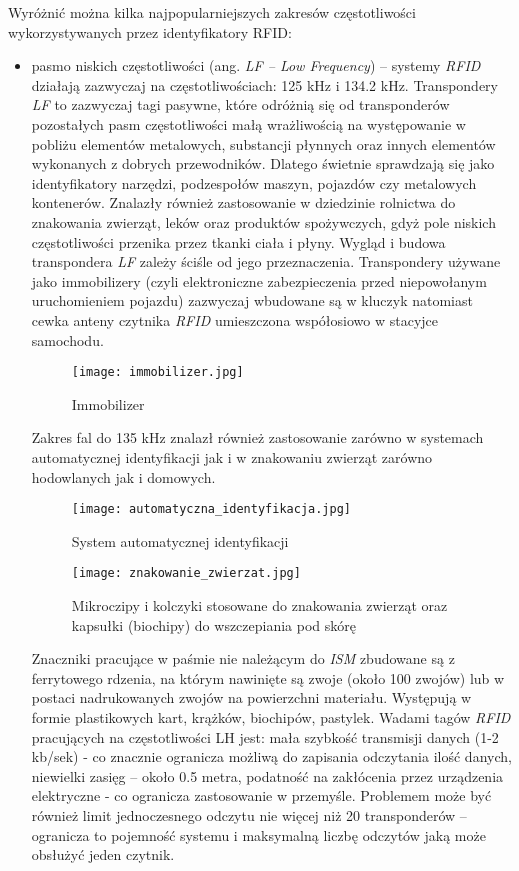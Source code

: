 Wyróżnić można kilka najpopularniejszych zakresów częstotliwości wykorzystywanych przez identyfikatory RFID:

\begin{itemize}\setlength{\itemsep}{0pt}
	\item pasmo niskich częstotliwości (ang. \emph {LF – Low Frequency}) – systemy \emph{RFID} działają zazwyczaj na częstotliwościach: 125 kHz i 134.2 kHz.
Transpondery \emph{LF} to zazwyczaj tagi pasywne, które odróżnią się od  transponderów pozostałych pasm częstotliwości małą wrażliwością na występowanie w pobliżu elementów metalowych, substancji płynnych oraz innych elementów wykonanych z dobrych przewodników. Dlatego świetnie sprawdzają się jako identyfikatory narzędzi, podzespołów maszyn, pojazdów czy metalowych kontenerów. Znalazły również zastosowanie w dziedzinie rolnictwa do znakowania zwierząt, leków oraz produktów spożywczych, gdyż pole niskich częstotliwości przenika przez tkanki ciała i płyny.
Wygląd i budowa transpondera \emph{LF} zależy ściśle od jego przeznaczenia. Transpondery używane jako immobilizery (czyli elektroniczne zabezpieczenia przed niepowołanym uruchomieniem pojazdu) zazwyczaj wbudowane są w kluczyk natomiast cewka anteny czytnika \emph{RFID} umieszczona współosiowo w stacyjce samochodu.
   
	\begin{figure}[h!]
	\centering
	    \texttt{[image: immobilizer.jpg]}
	    \caption{Immobilizer}
	\end{figure}

	\newpage

	Zakres fal do 135 kHz znalazł również zastosowanie zarówno w systemach automatycznej identyfikacji jak i w znakowaniu zwierząt  zarówno hodowlanych jak i domowych.

	\begin{figure}[h!]
	\centering
	    \texttt{[image: automatyczna\_identyfikacja.jpg]}
	    \caption{System automatycznej identyfikacji}
	\end{figure}
	
	\begin{figure}[h!]
	\centering
	    \texttt{[image: znakowanie\_zwierzat.jpg]}
	    \caption{Mikroczipy i kolczyki stosowane do znakowania zwierząt oraz kapsułki (biochipy) do wszczepiania pod skórę}
	\end{figure}
	
	Znaczniki pracujące w paśmie nie należącym do \emph{ISM} zbudowane są z ferrytowego rdzenia, na którym nawinięte są zwoje (około 100 zwojów) lub w postaci nadrukowanych zwojów na powierzchni materiału. Występują w formie plastikowych kart, krążków, biochipów, pastylek. Wadami tagów \emph{RFID} pracujących na częstotliwości LH jest: mała szybkość transmisji danych (1-2 kb/sek) - co znacznie ogranicza możliwą do zapisania odczytania ilość danych, niewielki zasięg – około 0.5 metra, podatność na zakłócenia przez urządzenia elektryczne  - co ogranicza zastosowanie w przemyśle. Problemem może być również limit jednoczesnego odczytu nie więcej niż 20 transponderów – ogranicza to pojemność systemu i maksymalną liczbę odczytów jaką może obsłużyć jeden czytnik. 


\end{itemize}
